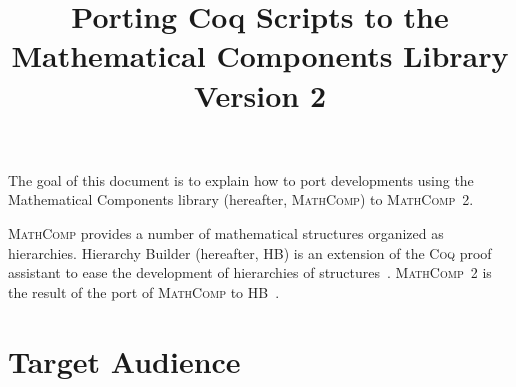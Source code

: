 \documentclass{article}
\title{Porting Coq Scripts to the Mathematical Components Library Version 2}
\def\coq{\textsc{Coq}}
\def\mathcomp{\textsc{MathComp}}
\def\mathcomptwo{\mathcomp~2}
\def\hb{\textsc{HB}}
\begin{document}
\maketitle

The goal of this document is to explain how to port developments
using the Mathematical Components library (hereafter, \mathcomp) to \mathcomptwo.

\mathcomp{} provides a number of mathematical structures organized as
hierarchies. Hierarchy Builder (hereafter, \hb) is an extension of the
\coq{} proof assistant to ease the development of hierarchies of
structures~\cite{cohen2020fscd}. \mathcomptwo{} is the result of the
port of \mathcomp{} to \hb{}~\cite{mathcomp2021coq}.

\tableofcontents

\section{Target Audience}
\end{document}
